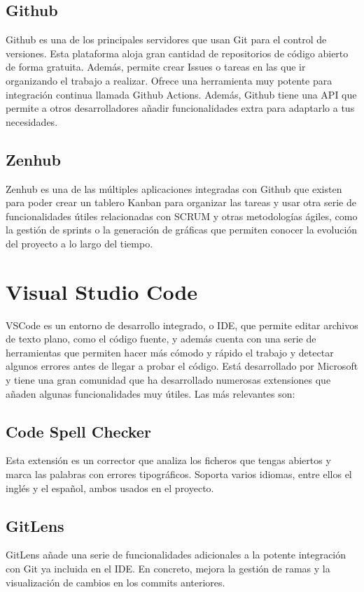 \subsection{Github}
Github es una de los principales servidores que usan Git para el control de versiones. Esta plataforma aloja gran cantidad de repositorios de código abierto de forma gratuita. Además, permite crear Issues o tareas en las que ir organizando el trabajo a realizar. Ofrece una herramienta muy potente para integración continua llamada Github Actions. Además, Github tiene una API que permite a otros desarrolladores añadir funcionalidades extra para adaptarlo a tus necesidades.
\subsection{Zenhub}
Zenhub es una de las múltiples aplicaciones integradas con Github que existen para poder crear un tablero Kanban para organizar las tareas y usar otra serie de funcionalidades útiles relacionadas con SCRUM y otras metodologías ágiles, como la gestión de sprints o la generación de gráficas que permiten conocer la evolución del proyecto a lo largo del tiempo.

\section{Visual Studio Code}
VSCode es un entorno de desarrollo integrado, o IDE, que permite editar archivos de texto plano, como el código fuente, y además cuenta con una serie de herramientas que permiten hacer más cómodo y rápido el trabajo y detectar algunos errores antes de llegar a probar el código. Está desarrollado por Microsoft y tiene una gran comunidad que ha desarrollado numerosas extensiones que añaden algunas funcionalidades muy útiles. Las más relevantes son:
\subsection{Code Spell Checker}
Esta extensión es un corrector que analiza los ficheros que tengas abiertos y marca las palabras con errores tipográficos. Soporta varios idiomas, entre ellos el inglés y el español, ambos usados en el proyecto.
\subsection{GitLens}
GitLens añade una serie de funcionalidades adicionales a la potente integración con Git ya incluida en el IDE. En concreto, mejora la gestión de ramas y la visualización de cambios en los commits anteriores.
